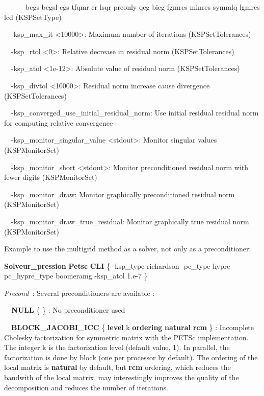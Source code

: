 \ \ \ \ \ \ bcgs bcgsl cgs tfqmr cr lsqr preonly qcg bicg fgmres minres symmlq lgmres lcd (KSPSetType)

\ \ {}-ksp\_max\_it {\textless}10000{\textgreater}: Maximum number of iterations (KSPSetTolerances)

\ \ {}-ksp\_rtol {\textless}0{\textgreater}: Relative decrease in residual norm (KSPSetTolerances)

\ \ {}-ksp\_atol {\textless}1e-12{\textgreater}: Absolute value of residual norm (KSPSetTolerances)

\ \ {}-ksp\_divtol {\textless}10000{\textgreater}: Residual norm increase cause divergence (KSPSetTolerances)

\ \ {}-ksp\_converged\_use\_initial\_residual\_norm: Use initial residual residual norm for computing relative
convergence

\ \ {}-ksp\_monitor\_singular\_value {\textless}stdout{\textgreater}: Monitor singular values (KSPMonitorSet)

\ \ {}-ksp\_monitor\_short {\textless}stdout{\textgreater}: Monitor preconditioned residual norm with fewer digits
(KSPMonitorSet)

\ \ {}-ksp\_monitor\_draw: Monitor graphically preconditioned residual norm (KSPMonitorSet)

\ \ {}-ksp\_monitor\_draw\_true\_residual: Monitor graphically true residual norm (KSPMonitorSet)


\bigskip

Example to use the multigrid method as a solver, not only as a preconditioner:

\textbf{Solveur}\textbf{\_pression} \textbf{Petsc} \textbf{CLI} \{
-ksp\_type richardson -pc\_type hypre -pc\_hypre\_type boomeramg -ksp\_atol 1.e-7 \}


\bigskip


\bigskip

\textit{Precond}\textit{~}: Several preconditioners are available :

\textit{\ \ }\textbf{NULL} \{ \} : No preconditioner used

\ \ \textbf{BLOCK\_JACOBI\_ICC }\{\textbf{ level }k \textbf{ordering} \textbf{natural} {\textbar} \textbf{rcm} \} :
Incomplete Cholesky factorization for symmetric matrix with the PETSc implementation. The integer k is
the factorization level (default value, 1). In parallel, the factorization is done by block (one per processor by
default). The ordering of the local matrix is \textbf{natural} by default, but \textbf{rcm} ordering,
which reduces the bandwith of the local matrix, may interestingly improves the quality of the decomposition and reduces
the number of iterations.

